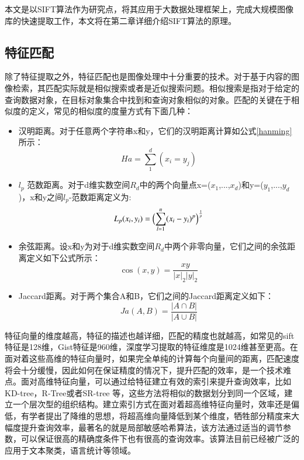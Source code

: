 本文是以SIFT算法作为研究点，将其应用于大数据处理框架上，完成大规模图像库的快速提取工作，本文将在第二章详细介绍SIFT算法的原理。

\subsection{特征匹配}
除了特征提取之外，特征匹配也是图像处理中十分重要的技术。对于基于内容的图像检索，其匹配实际就是相似搜索或者是近似搜索问题。相似搜索是指对于给定的查询数据对象，在目标对象集合中找到和查询对象相似的对象。匹配的关键在于相似度的定义，常见的相似度的度量方式有下面几种：
\begin{itemize}
\item 汉明距离。对于任意两个字符串x和y，它们的汉明距离计算如公式\ref{hanming}所示：
\begin{equation}\label{hanming}
Ha=\sum_{1}^d(x_i=y_j)
\end{equation}

\item $l_p$ 范数距离。对于d维实数空间$R_d$中的两个向量点x=($x_1$,...,$x_d$)和y=($y_1$,...,$y_d$)，x和y之间$l_p$-范数距离定义为:
\begin{equation}\label{fanshu}
L_p(x_i,y_i)=\Bigl(\sum_{l=1}^n(x_i-y_i)^p\Bigr)^\frac{1}{p}
\end{equation}

\item 余弦距离。设x和y为对于d维实数空间$R_d$中两个非零向量，它们之间的余弦距离定义如下公式所示：
\begin{equation}\label{yuxian}
\cos(x,y)=\frac{xy}{|x|_2|y|_2}
\end{equation}

\item Jaccard距离。对于两个集合A和B，它们之间的Jaccard距离定义如下：
\begin{equation}\label{Jaccard}
Ja(A,B)=\frac{|{A}\cap{B}|}{|{A}\cup{B}|}
\end{equation}
\end{itemize}

特征向量的维度越高，特征的描述也越详细，匹配的精度也就越高，如常见的sift特征是128维，Gist特征是960维，深度学习提取的特征维度是1024维甚至更高。在面对着这些高维的特征向量时，如果完全单纯的计算每个向量间的距离，匹配速度将会十分缓慢，因此如何在保证精度的情况下，提升匹配的效率，是一个技术难点。面对高维特征向量，可以通过给特征建立有效的索引来提升查询效率，比如KD-tree，R-Tree或者SR-tree 等，这些方法将相似的数据划分到同一个区域，建立一个层次型的组织结构。建立索引方式在面对着超高维特征向量时，效率还是偏低，有学者提出了降维的思想，将超高维向量降低到某个维度，牺牲部分精度来大幅度提升查询效率，最著名的就是局部敏感哈希算法，该方法通过适当的调节参数，可以保证很高的精确度条件下也有很高的查询效率。该算法目前已经被广泛的应用于文本聚类，语言统计等领域。

